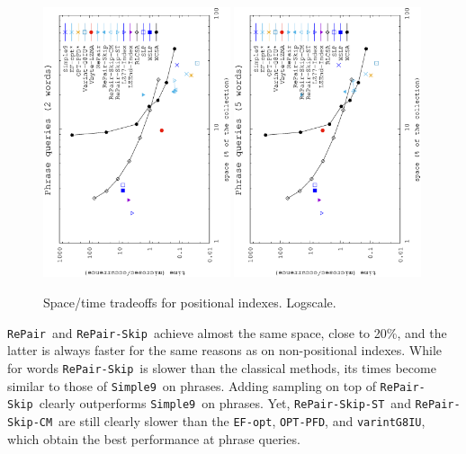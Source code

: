 \documentclass[review]{elsarticle}
\newcommand{\simplen}{\texttt{Simple9}}
\newcommand{\repairNo}{\texttt{RePair}}
\newcommand{\repairSkip}{\texttt{RePair-Skip}}
\newcommand{\repairSkipCM}{\texttt{RePair-Skip-CM}}
\newcommand{\repairSkipST}{\texttt{RePair-Skip-ST}}
\newcommand{\efopt}{\texttt{EF-opt}}
\newcommand{\optpfd}{\texttt{OPT-PFD}}
\newcommand{\varint}{\texttt{varintG8IU}}
\begin{document}
\begin{figure}[t]
\begin{center}
\includegraphics[angle=-90,width=0.49\textwidth]{../figures/f4/phrases2-2/locate-2_2.eps}
\includegraphics[angle=-90,width=0.49\textwidth]{../figures/f4/phrases5-5/locate-5_5.eps}
\caption{Space/time tradeoffs for positional indexes. Logscale.}
\label{fig:pos2.2}
\end{center}
\end{figure}



\repairNo\ and \repairSkip\ achieve almost the same space, %
close to 20\%,
and the latter is always faster for the same reasons as on
non-positional indexes. While for words \repairSkip\ is slower than the 
classical methods, its times become similar to those of \simplen\ on phrases. Adding sampling on 
top of \repairSkip\ clearly outperforms \simplen\ on phrases. 
Yet, \repairSkipST\ and \repairSkipCM\ are still clearly slower than the \efopt, \optpfd, and \varint, which obtain the best performance at phrase queries.
\end{document}
